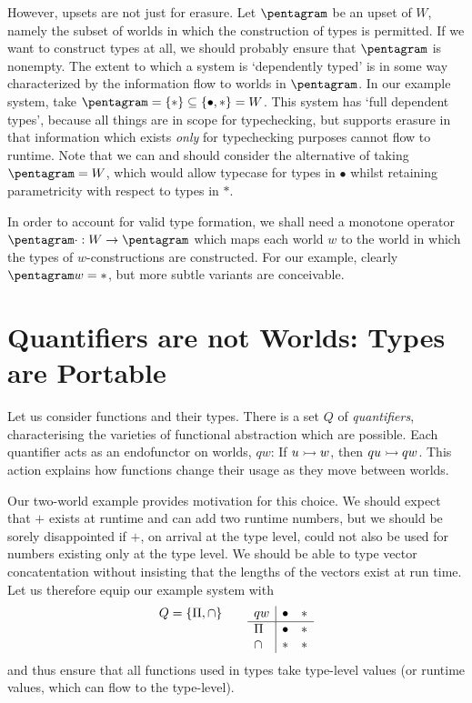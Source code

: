 \documentclass{sigplanconf}
\begin{document}
However, upsets are not just for erasure. Let $\Ty$ be an upset of
$W$, namely the subset of worlds in which the construction of types is
permitted. If we want to construct types at all, we should probably
ensure that $\Ty$ is nonempty. The extent to which a system is
`dependently typed' is in some way characterized by the information
flow to worlds in $\Ty$.  In our example system, take
$\Ty=\{\heaven\}\subseteq\{\earth,\heaven\}=W$. This system has `full
dependent types', because all things are in scope for typechecking,
but supports erasure in that information which exists \emph{only} for
typechecking purposes cannot flow to runtime. Note that we can and
should consider the alternative of taking $\Ty=W$, which would allow
typecase for types in $\bullet$ whilst retaining parametricity with
respect to types in $\ast$.

In order to account for valid type formation, we shall need a monotone
operator $\Ty\cdot : W \to \Ty$ which maps each world $w$ to the world
in which the types of $w$-constructions are constructed. For our
example, clearly $\Ty w = \ast$, but more subtle variants are
conceivable.


\section{Quantifiers are not Worlds: Types are Portable}

\newcommand{\Q}{}
 Let us consider functions and their types.  There is a set $Q$ of
\emph{quantifiers}, characterising the varieties of functional
abstraction which are possible. Each quantifier acts as an endofunctor on
worlds, $\Q{q}w$: If $u \rightarrowtail w$, then $\Q{q}u \wto \Q{q}w$.  This action explains
how functions change their usage as they move between worlds.

\newcommand{\V}{\mathit}
\newcommand{\F}{\mathsf}
\newcommand{\D}{\mathsf}
Our two-world example provides motivation for this choice. We should
expect that $\F{+}$ exists at runtime and can add two runtime numbers,
but we should be sorely disappointed if $\F{+}$, on arrival at the type
level, could not also be used for numbers
existing only at the type level. We should be able to type vector
concatentation without insisting that the lengths of the vectors
exist at run time. Let us therefore equip our example system with
\[
Q=\{\Q{\Pi},\Q{\cap}\}\qquad
\begin{array}[t]{l|cc}
\Q{q}w & \earth & \heaven \\
\hline
\Pi & \earth & \heaven \\
\cap & \heaven & \heaven
\end{array}
\]
and thus ensure that all functions used in types take type-level
values (or runtime values, which can flow to the type-level).
\end{document}
